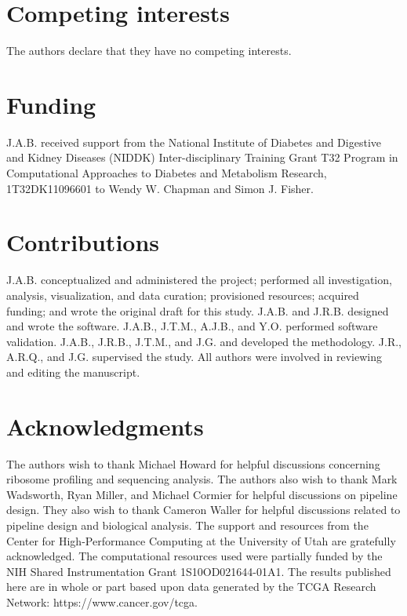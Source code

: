 \documentclass[11pt, a4paper, oneside]{article}
\begin{document}
\section*{Competing interests}
The authors declare that they have no competing interests.

\section*{Funding}
J.A.B. received support from the National Institute of Diabetes and Digestive and Kidney Diseases (NIDDK) Inter-disciplinary Training Grant T32 Program in Computational Approaches to Diabetes and Metabolism Research, 1T32DK11096601 to Wendy W. Chapman and Simon J. Fisher.

\section*{Contributions}
J.A.B. conceptualized and administered the project; performed all investigation, analysis, visualization, and data curation; provisioned resources; acquired funding; and wrote the original draft for this study. J.A.B. and J.R.B. designed and wrote the software. J.A.B., J.T.M., A.J.B., and Y.O. performed software validation. J.A.B., J.R.B., J.T.M., and J.G. and developed the methodology. J.R., A.R.Q., and J.G. supervised the study. All authors were involved in reviewing and editing the manuscript.

\section*{Acknowledgments}
The authors wish to thank Michael Howard for helpful discussions concerning ribosome profiling and sequencing analysis. The authors also wish to thank Mark Wadsworth, Ryan Miller, and Michael Cormier for helpful discussions on pipeline design. They also wish to thank Cameron Waller for helpful discussions related to pipeline design and biological analysis. The support and resources from the Center for High-Performance Computing at the University of Utah are gratefully acknowledged. The computational resources used were partially funded by the NIH Shared Instrumentation Grant 1S10OD021644-01A1. The results published here are in whole or part based upon data generated by the TCGA Research Network: https://www.cancer.gov/tcga.
\end{document}
